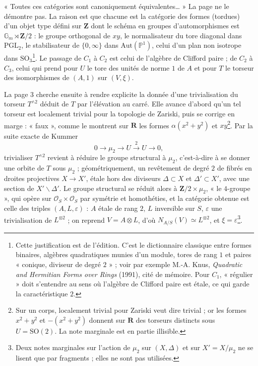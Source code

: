\documentclass[11pt,a4paper]{article}
\begin{document}
« Toutes ces catégories sont canoniquement équivalentes… » La page ne le
démontre pas. La raison est que chacune est la catégorie des formes (tordues)
d'un objet type défini sur $\mathbf{Z}$ dont le schéma en groupes
d'automorphismes est $\mathbb{G}_m \rtimes \mathbf{Z}/2$ : le groupe orthogonal de
$xy$, le normalisateur du tore diagonal dans $\mathrm{PGL}_2$, le stabilisateur
de $\{0, \infty\}$ dans $\mathrm{Aut}(\mathbb{P}^1)$, celui d'un plan non
isotrope dans $\mathrm{SO}_3$\footnote{Cette justification est de l'édition.
C'est le dictionnaire classique entre formes binaires, algèbres quadratiques
munies d'un module, tores de rang $1$ et paires « conique, diviseur de degré
$2$ » ; voir par exemple M.-A. Knus, \emph{Quadratic and Hermitian Forms over
Rings} (1991), cité de mémoire. Pour $C_1$, « régulier » doit s'entendre au sens
où l'algèbre de Clifford paire est étale, ce qui garde la caractéristique $2$.}.
Le passage de $C_1$ à $C_2$ est celui de l'algèbre de Clifford paire ; de $C_2$
à $C_3$, celui qui prend pour $U$ le tore des unités de norme $1$ de $A$ et
pour $T$ le torseur des isomorphismes de $(A, 1)$ sur $(V, \xi)$.

La page 3 cherche ensuite à rendre explicite la donnée d'une trivialisation du
torseur $T^{\wedge 2}$ déduit de $T$ par l'élévation au carré. Elle avance
d'abord qu'un tel torseur est localement trivial pour la topologie de Zariski,
puis se corrige en marge : « faux », comme le montrent sur $\mathbf{R}$ les formes
$\alpha(x^2 + y^2)$ et $xy$\footnote{Sur un corps, localement trivial pour
Zariski veut dire trivial ; or les formes $x^2 + y^2$ et $-(x^2 + y^2)$ donnent
sur $\mathbf{R}$ des torseurs distincts sous $U = \mathrm{SO}(2)$. La note marginale
est en partie illisible.}. Par la suite exacte de Kummer
\[
  0 \to \mu_2 \to U \xrightarrow{\ 2\ } U \to 0,
\]
trivialiser $T^{\wedge 2}$ revient à réduire le groupe structural à $\mu_2$,
c'est-à-dire à se donner une orbite de $T$ sous $\mu_2$ ; géométriquement, un
revêtement de degré $2$ de fibrés en droites projectives $X \to X'$, étale hors
des diviseurs $\Delta \subset X$ et $\Delta' \subset X'$, avec une section de
$X' \smallsetminus \Delta'$. Le groupe structural se réduit alors à
$\mathbf{Z}/2 \times \mu_2$, « le $4$-groupe », qui opère sur
$\mathcal{O}_S \times \mathcal{O}_S$ par symétrie et homothéties, et la catégorie
obtenue est celle des triples $(A, L, \varepsilon)$ : $A$ étale de rang $2$, $L$
inversible sur $S$, $\varepsilon$ une trivialisation de $L^{\otimes 2}$ ; on
reprend $V = A \otimes L$, d'où $N_{A/S}(V) \simeq L^{\otimes 2}$, et $\xi =
\varepsilon$\footnote{Deux notes marginales sur l'action de $\mu_2$ sur $(X,
\Delta)$ et sur $X' = X/\mu_2$ ne se lisent que par fragments ; elles ne sont
pas utilisées.}.
\end{document}

